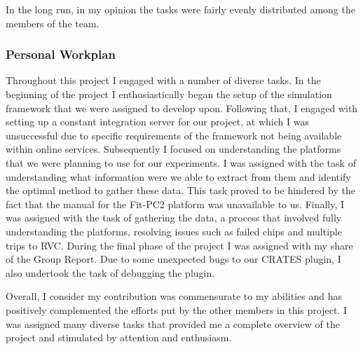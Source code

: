 In the long run, in my opinion the tasks were fairly evenly distributed among
the members of the team.

\subsubsection{Personal Workplan}
Throughout this project I engaged with a number of diverse tasks. In the
beginning of the project I enthusiastically began the setup of the simulation
framework that we were assigned to develop upon. Following that, I engaged with
setting up a constant integration server for our project, at which I was
unsuccessful due to specific requirements of the framework not being available
within online services. Subsequently I focused on understanding the platforms
that we were planning to use for our experiments. I was assigned with the task
of understanding what information were we able to extract from them and identify
the optimal method to gather these data. This task proved to be hindered by the
fact that the manual for the Fit-PC2 platform was unavailable to us. Finally, I
was assigned with the task of gathering the data, a process that involved fully
understanding the platforms, resolving issues such as failed chips and multiple
trips to RVC. During the final phase of the project I was assigned with my share
of the Group Report. Due to some unexpected bugs to our CRATES plugin, I also
undertook the task of debugging the plugin.

Overall, I consider my contribution was commensurate to my abilities and has
positively complemented the efforts put by the other members in this project. I
was assigned many diverse tasks that provided me a complete overview of the
project and stimulated by attention and enthusiasm.


